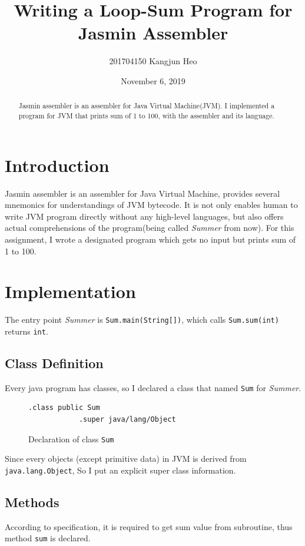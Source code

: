 \documentclass[a4paper, 12pt]{article}
\title{Writing a Loop-Sum Program for Jasmin Assembler}
\date{November 6, 2019}
\author{201704150 Kangjun Heo}
\begin{document}
    \maketitle

    \begin{abstract}
        Jasmin assembler is an assembler for Java Virtual Machine(JVM). I implemented a program for JVM that prints sum of 1 to 100, with the assembler and its language.
    \end{abstract}

    \tableofcontents

    \section{Introduction}
    Jasmin assembler is an assembler for Java Virtual Machine, provides several mnemonics for understandings of JVM bytecode.\cite{oracle_isa} It is not only enables human to write JVM program directly without any high-level languages, but also offers actual comprehensions of the program(being called \textit{Summer} from now). For this assignment, I wrote a designated program which gets no input but prints sum of 1 to 100.

    \section{Implementation}
    The entry point \textit{Summer} is \texttt{Sum.main(String[])}, which calls \texttt{Sum.sum(int)} returns \texttt{int}.

        \subsection{Class Definition}
        Every java program has classes, so I declared a class that named \texttt{Sum} for \textit{Summer}.
        \begin{figure}[H]
            \begin{lstlisting}[gobble=8]
            .class public Sum
            .super java/lang/Object
            \end{lstlisting}
    
            \centering        
            \caption{Declaration of class \texttt{Sum}}
        \end{figure}
        Since every objects (except primitive data) in JVM is derived from \texttt{java.lang.Object}, So I put an explicit super class information.  

        \subsection{Methods}
        According to specification, it is required to get sum value from subroutine, thus method \texttt{sum} is declared.
\end{document}
